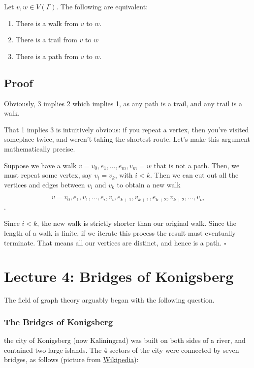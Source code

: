 \documentclass[]{article}
\providecommand{\tightlist}{%
  \setlength{\itemsep}{0pt}\setlength{\parskip}{0pt}}
\begin{document}
Let \(v,w\in V(\Gamma)\). The following are equivalent:

\begin{enumerate}
\def\labelenumi{\arabic{enumi}.}
\tightlist
\item
  There is a walk from \(v\) to \(w\).
\item
  There is a trail from \(v\) to \(w\)
\item
  There is a path from \(v\) to \(w\).
\end{enumerate}

\subsection{Proof}\label{proof-2}

Obviously, 3 implies 2 which implies 1, as any path is a trail, and any
trail is a walk.

That 1 implies 3 is intuitively obvious: if you repeat a vertex, then
you've visited someplace twice, and weren't taking the shortest route.
Let's make this argument mathematically precise.

Suppose we have a walk \(v=v_0,e_1,\dots, e_m, v_m=w\) that is not a
path. Then, we must repeat some vertex, say \(v_i=v_k\), with \(i<k\).
Then we can cut out all the vertices and edges between \(v_i\) and
\(v_k\) to obtain a new walk

\[v=v_0,e_1, v_1,\dots, e_i, v_i, e_{k+1}, v_{k+1}, e_{k+2}, v_{k+2}, \dots, v_m\].

Since \(i<k\), the new walk is strictly shorter than our original walk.
Since the length of a walk is finite, if we iterate this process the
result must eventually terminate. That means all our vertices are
distinct, and hence is a path. \(\square\)

\section{Lecture 4: Bridges of Konigsberg}

The field of graph theory arguably began with the following question.

\subsubsection{The Bridges of Konigsberg}\label{the-bridges-of-konigsberg}

the city of Konigsberg (now Kaliningrad) was built on both sides of a
river, and contained two large islands. The 4 sectors of the city were
connected by seven bridges, as follows (picture from
\href{https://en.wikipedia.org/wiki/Seven_Bridges_of_K\%C3\%B6nigsberg}{Wikipedia}):
\end{document}
